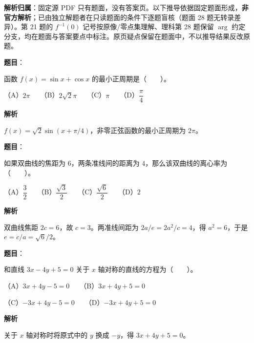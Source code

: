 

\begin{gknotice}
\textbf{解析归属}：固定源 PDF 只有题面，没有答案页。以下推导依据固定题面形成，\textbf{非官方解析}；已由独立解题者在只读题面的条件下逐题盲核（题面 28 题无转录差异）。第 21 题的 \(f^{-1}(0)\) 记号按原像/零点集理解、理科第 28 题保留 \(\arg\) 约定分支，均在题面与答案要点中标注。原页疑点保留在题面中，不以推导结果反改原题。
\end{gknotice}

\begin{answer}

\textbf{题目}：

函数 $f(x)=\sin x+\cos x$ 的最小正周期是\mbox{（　　）}。

（A）$2\pi$　　（B）$2\sqrt2\pi$　　（C）$\pi$　　（D）$\dfrac\pi4$

\textbf{解析}

$f(x)=\sqrt2\sin(x+\pi/4)$，非零正弦函数的最小正周期为 $2\pi$。


\end{answer}
\begin{answer}

\textbf{题目}：

如果双曲线的焦距为 $6$，两条准线间的距离为 $4$，那么该双曲线的离心率为\mbox{（　　）}。

（A）$\dfrac32$　　（B）$\dfrac{\sqrt3}{2}$　　（C）$\dfrac{\sqrt6}{2}$　　（D）$2$

\textbf{解析}

双曲线焦距 $2c=6$，故 $c=3$。两准线间距为 $2a/e=2a^2/c=4$，得 $a^2=6$，于是 $e=c/a=\sqrt6/2$。


\end{answer}
\begin{answer}

\textbf{题目}：

和直线 $3x-4y+5=0$ 关于 $x$ 轴对称的直线的方程为\mbox{（　　）}。

（A）$3x+4y-5=0$　　（B）$3x+4y+5=0$

（C）$-3x+4y-5=0$　　（D）$-3x+4y+5=0$

\textbf{解析}

关于 $x$ 轴对称时将原式中的 $y$ 换成 $-y$，得 $3x+4y+5=0$。


\end{answer}
